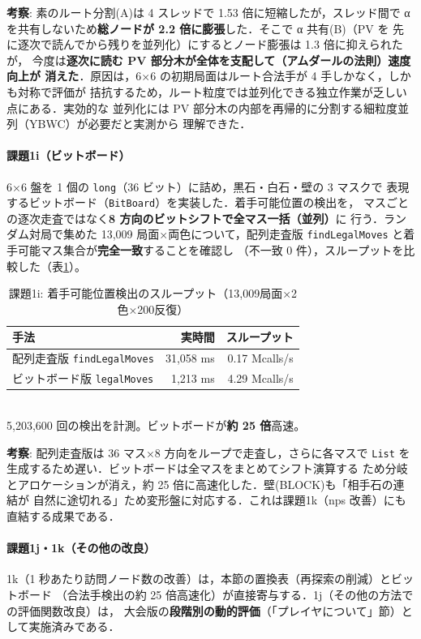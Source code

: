 \documentclass[11pt,a4j]{ujarticle} %
\begin{document}
\textbf{考察}: 素のルート分割(A)は 4 スレッドで 1.53 倍に短縮したが，スレッド間で
α を共有しないため\textbf{総ノードが 2.2 倍に膨張}した．そこで α 共有(B)（PV を
先に逐次で読んでから残りを並列化）にするとノード膨張は 1.3 倍に抑えられたが，
今度は\textbf{逐次に読む PV 部分木が全体を支配して（アムダールの法則）速度向上が
消えた}．原因は，6×6 の初期局面はルート合法手が 4 手しかなく，しかも対称で評価が
拮抗するため，ルート粒度では並列化できる独立作業が乏しい点にある．実効的な
並列化には PV 部分木の内部を再帰的に分割する細粒度並列（YBWC）が必要だと実測から
理解できた．

\paragraph{課題1i（ビットボード）}
6×6 盤を 1 個の {\verb+long+}（36 ビット）に詰め，黒石・白石・壁の 3 マスクで
表現するビットボード（{\verb+BitBoard+}）を実装した．着手可能位置の検出を，
マスごとの逐次走査ではなく\textbf{8 方向のビットシフトで全マス一括（並列）}に
行う．ランダム対局で集めた 13{,}009 局面×両色について，配列走査版
{\verb+findLegalMoves+} と着手可能マス集合が\textbf{完全一致}することを確認し
（不一致 0 件），スループットを比較した（表\ref{tab:1i}）。

\begin{table}[h]\center
\caption{課題1i: 着手可能位置検出のスループット（13{,}009局面×2色×200反復）}\label{tab:1i}
\begin{tabular}{l|r|r}
手法 & 実時間 & スループット \\ \hline\hline
配列走査版 {\tt findLegalMoves} & 31{,}058 ms & 0.17 Mcalls/s \\
ビットボード版 {\tt legalMoves} &  1{,}213 ms & 4.29 Mcalls/s \\
\end{tabular}\\
{\small 5{,}203{,}600 回の検出を計測。ビットボードが\textbf{約 25 倍}高速。}
\end{table}

\textbf{考察}: 配列走査版は 36 マス×8 方向をループで走査し，さらに各マスで
{\verb+List+} を生成するため遅い．ビットボードは全マスをまとめてシフト演算する
ため分岐とアロケーションが消え，約 25 倍に高速化した．壁(BLOCK)も「相手石の連結が
自然に途切れる」ため変形盤に対応する．これは課題1k（nps 改善）にも直結する成果である．

\paragraph{課題1j・1k（その他の改良）}
1k（1 秒あたり訪問ノード数の改善）は，本節の置換表（再探索の削減）とビットボード
（合法手検出の約 25 倍高速化）が直接寄与する．1j（その他の方法での評価関数改良）は，
大会版の\textbf{段階別の動的評価}（「プレイヤについて」節）として実施済みである．
\end{document}
